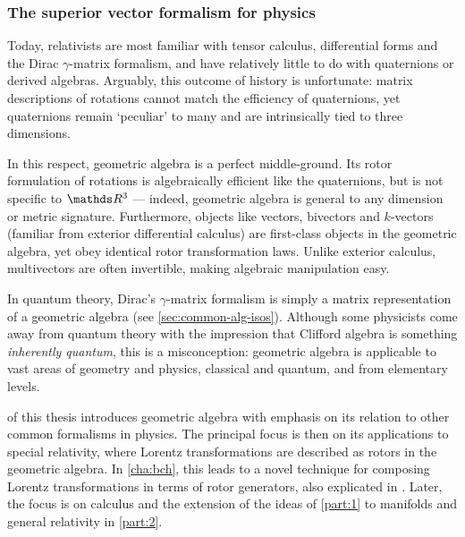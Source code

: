\subsubsection{The superior vector formalism for physics}

Today, relativists are most familiar with tensor calculus, differential forms and the Dirac $γ$-matrix formalism, and have relatively little to do with quaternions or derived algebras.
Arguably, this outcome of history is unfortunate: matrix descriptions of rotations cannot match the efficiency of quaternions, yet quaternions remain `peculiar' to many and are intrinsically tied to three dimensions.

In this respect, geometric algebra is a perfect middle-ground.
Its rotor formulation of rotations is algebraically efficient like the quaternions, but is not specific to $\RR^3$ --- indeed, geometric algebra is general to any dimension or metric signature.
Furthermore, objects like vectors, bivectors and $k$-vectors (familiar from exterior differential calculus) are first-class objects in the geometric algebra, yet obey identical rotor transformation laws.
Unlike exterior calculus, multivectors are often invertible, making algebraic manipulation easy.

In quantum theory, Dirac's $γ$-matrix formalism is simply a matrix representation of a geometric algebra (see \cref{sec:common-alg-isos}).
Although some physicists come away from quantum theory with the impression that Clifford algebra is something \emph{inherently quantum}, this is a misconception: geometric algebra is applicable to vast areas of geometry and physics, classical and quantum, and from elementary levels.

 of this thesis introduces geometric algebra with emphasis on its relation to other common formalisms in physics.
The principal focus is then on its applications to special relativity, where Lorentz transformations are described as rotors in the geometric algebra.
In \cref{cha:bch}, this leads to a novel technique for composing Lorentz transformations in terms of rotor generators, also explicated in \cite{wilson2021ga-bch}.
Later, the focus is on calculus and the extension of the ideas of \cref{part:1} to manifolds and general relativity in \cref{part:2}.

